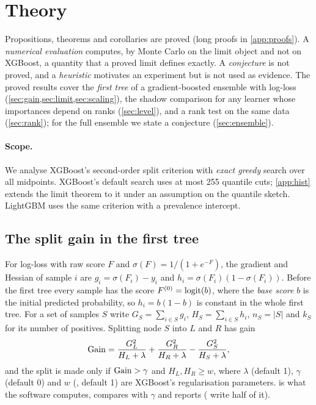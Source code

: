 \section{Theory}\label{sec:theory}

Propositions, theorems and corollaries are proved (long proofs in \cref{app:proofs}). A \emph{numerical evaluation} computes, by Monte Carlo on the limit object and not on XGBoost, a quantity that a proved limit defines exactly. A \emph{conjecture} is not proved, and a \emph{heuristic} motivates an experiment but is not used as evidence. The proved results cover the \emph{first tree} of a gradient-boosted ensemble with log-loss (\cref{sec:gain,sec:limit,sec:scaling}), the shadow comparison for any learner whose importances depend on ranks (\cref{sec:level}), and a rank test on the same data (\cref{sec:rank}); for the full ensemble we state a conjecture (\cref{sec:ensemble}).

\paragraph{Scope.} We analyse XGBoost's second-order split criterion with \emph{exact greedy} search over all midpoints. XGBoost's default  search uses at most 255 quantile cuts; \cref{app:hist} extends the limit theorem to it under an assumption on the quantile sketch. LightGBM \citep{ke2017lightgbm} uses the same criterion with a prevalence intercept.

\subsection{The split gain in the first tree}\label{sec:gain}

For log-loss with raw score $F$ and $\sigma(F) = 1/(1+e^{-F})$, the gradient and Hessian of sample $i$ are $g_i = \sigma(F_i) - y_i$ and $h_i = \sigma(F_i)(1-\sigma(F_i))$. Before the first tree every sample has the score $F^{(0)} = \operatorname{logit}(b)$, where the \emph{base score} $b$ is the initial predicted probability, so $h_i = b(1-b)$ is constant in the whole first tree. For a set of samples $S$ write $G_S = \sum_{i\in S} g_i$, $H_S = \sum_{i\in S} h_i$, $n_S = |S|$ and $k_S$ for its number of positives. Splitting node $S$ into $L$ and $R$ has gain
\begin{equation}\label{eq:gain}
  \operatorname{Gain} = \frac{G_L^2}{H_L+\lambda} + \frac{G_R^2}{H_R+\lambda} - \frac{G_S^2}{H_S+\lambda},
\end{equation}
and the split is made only if $\operatorname{Gain} > \gamma$ and $H_L, H_R \ge w$, where $\lambda$ (default 1), $\gamma$ (default 0) and $w$ (, default 1) are XGBoost's regularisation parameters.  is what the software computes, compares with $\gamma$ and reports (\citet{chen2016xgboost} write half of it).

